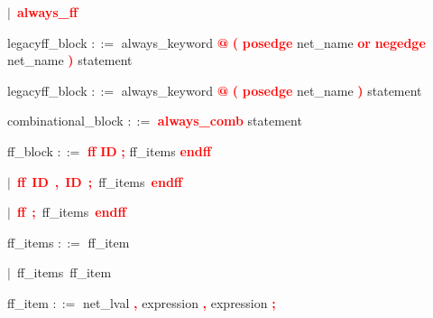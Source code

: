 \mbox{$|$ \textbf{\textcolor{red}{always\_ff}}}

\vspace{1em}
\noindent
\settowidth{\parindent}{\hspace{4ex}}
legacyff\_block $::=$\hspace{1ex} always\_keyword \textbf{\textcolor{red}{@}} \textbf{\textcolor{red}{(}} \textbf{\textcolor{red}{posedge}} net\_name \textbf{\textcolor{red}{or}} \textbf{\textcolor{red}{negedge}} net\_name \textbf{\textcolor{red}{)}} statement

\vspace{1em}
\noindent
\settowidth{\parindent}{\hspace{4ex}}
legacyff\_block $::=$\hspace{1ex} always\_keyword \textbf{\textcolor{red}{@}} \textbf{\textcolor{red}{(}} \textbf{\textcolor{red}{posedge}} net\_name \textbf{\textcolor{red}{)}} statement

\vspace{1em}
\noindent
\settowidth{\parindent}{\hspace{4ex}}
combinational\_block $::=$\hspace{1ex} \textbf{\textcolor{red}{always\_comb}} statement

\vspace{1em}
\noindent
\settowidth{\parindent}{\hspace{4ex}}
ff\_block $::=$\hspace{1ex} \textbf{\textcolor{red}{ff}} \textbf{\textcolor{red}{ID}} \textbf{\textcolor{red}{;}} ff\_items \textbf{\textcolor{red}{endff}}

\mbox{$|$ \textbf{\textcolor{red}{ff}} \textbf{\textcolor{red}{ID}} \textbf{\textcolor{red}{,}} \textbf{\textcolor{red}{ID}} \textbf{\textcolor{red}{;}} ff\_items \textbf{\textcolor{red}{endff}}}

\mbox{$|$ \textbf{\textcolor{red}{ff}} \textbf{\textcolor{red}{;}} ff\_items \textbf{\textcolor{red}{endff}}}

\vspace{1em}
\noindent
\settowidth{\parindent}{\hspace{4ex}}
ff\_items $::=$\hspace{1ex} ff\_item

\mbox{$|$ ff\_items ff\_item}

\vspace{1em}
\noindent
\settowidth{\parindent}{\hspace{4ex}}
ff\_item $::=$\hspace{1ex} net\_lval \textbf{\textcolor{red}{,}} expression \textbf{\textcolor{red}{,}} expression \textbf{\textcolor{red}{;}}

